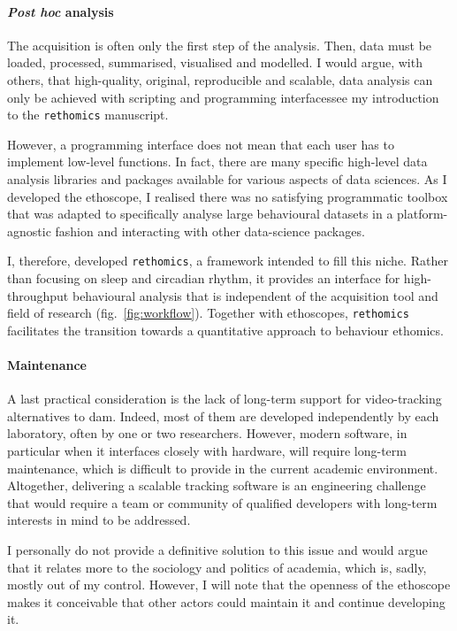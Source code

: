 \paragraph*{\emph{Post hoc} analysis}

The acquisition is often only the first step of the analysis.
Then, data must be loaded, processed, summarised, visualised and modelled.
I would argue, with others, that high-quality, original, reproducible and scalable, 
data analysis can only be achieved with scripting and programming interfaces\emd{}see my introduction to the 
\texttt{rethomics} manuscript\cite{geissmann_rethomics_2018}.

However, a programming interface does not mean that each user has to implement low-level functions.
In fact, there are many specific high-level data analysis libraries and packages available for various aspects of data sciences.
As I developed the ethoscope, I realised there was no satisfying programmatic toolbox that
was adapted to specifically analyse large behavioural datasets in a platform-agnostic fashion and interacting with other data-science packages.

I, therefore, developed \texttt{rethomics}, a framework intended to fill this niche. 
Rather than focusing on sleep and circadian rhythm, it provides an interface for high-throughput behavioural analysis that is independent of the acquisition tool and field of research (fig.~\ref{fig:workflow}).
Together with ethoscopes, \texttt{rethomics} facilitates the transition towards a quantitative approach to behaviour\emd{}\ie{} ethomics.


\paragraph*{Maintenance}
A last practical consideration is the lack of long-term support for video-tracking alternatives to \gls{dam}.
Indeed, most of them are developed independently by each laboratory, often by one or two researchers. 
However, modern software, in particular when it interfaces closely with hardware, will require long-term maintenance, 
which is difficult to provide in the current academic environment\cite{morin_shining_2012}.
Altogether, delivering a scalable tracking software is an engineering challenge that would require a team or community of qualified developers with long-term interests in mind to be addressed. 

I personally do not provide a definitive solution to this issue and would argue that it relates more to the sociology and politics of academia, which is, sadly, mostly out of my control.
However, I will note that the openness of the ethoscope makes it conceivable that other actors could maintain it and continue developing it.


